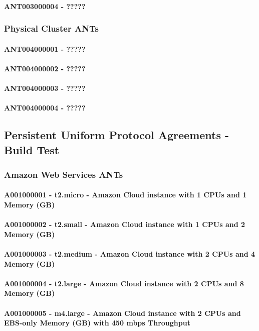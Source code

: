 \documentclass{acm_proc_article-sp}
\begin{document}
\paragraph{ANT003000004 - ?????}
\subsubsection{Physical Cluster ANTs}
\paragraph{ANT004000001 - ?????}
\paragraph{ANT004000002 - ?????}
\paragraph{ANT004000003 - ?????}
\paragraph{ANT004000004 - ?????}
\subsection{Persistent Uniform Protocol Agreements - Build Test}
\subsubsection{Amazon Web Services ANTs}
\paragraph{A001000001 - t2.micro - Amazon Cloud instance with 1 CPUs and 1 Memory (GB)}
\paragraph{A001000002 - t2.small - Amazon Cloud instance with 1 CPUs and 2 Memory (GB)}
\paragraph{A001000003 - t2.medium - Amazon Cloud instance with 2 CPUs and 4 Memory (GB)}
\paragraph{A001000004 - t2.large - Amazon Cloud instance with 2 CPUs and 8 Memory (GB)}
\paragraph{A001000005 - m4.large - Amazon Cloud instance with 2 CPUs and EBS-only Memory (GB) with 450 mbps Throughput}
\end{document}
